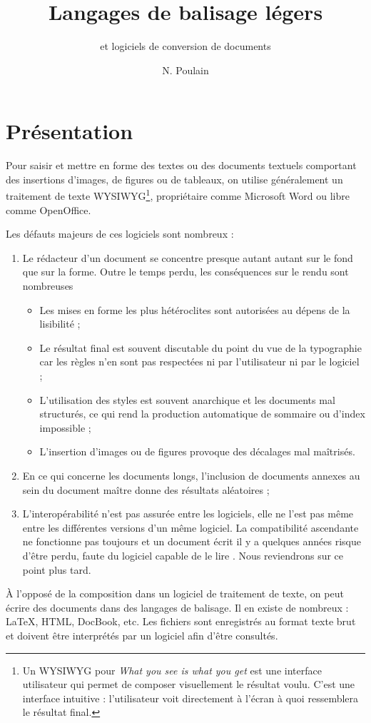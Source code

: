 \documentclass[12pt]{article}
\title{Langages de balisage légers}
\author{et logiciels de conversion de documents}
\date{N. Poulain}
\begin{document}
\maketitle

\tableofcontents
\newpage


\section{Présentation}

Pour saisir et mettre en forme des textes ou des documents textuels
comportant des insertions d'images, de figures ou de tableaux, on
utilise généralement un traitement de texte WYSIWYG\footnote{Un WYSIWYG
  pour \emph{What you see is what you get} est une interface utilisateur
  qui permet de composer visuellement le résultat voulu. C'est une
  interface intuitive : l'utilisateur voit directement à l'écran à quoi
  ressemblera le résultat final.}, propriétaire comme Microsoft Word ou
libre comme OpenOffice.

Les défauts majeurs de ces logiciels sont nombreux :

\begin{enumerate}[1.]
\item
  Le rédacteur d'un document se concentre presque autant autant sur le
  fond que sur la forme. Outre le temps perdu, les conséquences sur le
  rendu sont nombreuses
  \begin{itemize}
  \item
    Les mises en forme les plus hétéroclites sont autorisées au dépens
    de la lisibilité ;
  \item
    Le résultat final est souvent discutable du point du vue de la
    typographie car les règles n'en sont pas respectées ni par
    l'utilisateur ni par le logiciel ;
  \item
    L'utilisation des styles est souvent anarchique et les documents mal
    structurés, ce qui rend la production automatique de sommaire ou
    d'index impossible ;
  \item
    L'insertion d'images ou de figures provoque des décalages mal
    maîtrisés.
  \end{itemize}
\item
  En ce qui concerne les documents longs, l'inclusion de documents
  annexes au sein du document maître donne des résultats aléatoires ;
\item
  L'interopérabilité n'est pas assurée entre les logiciels, elle ne
  l'est pas même entre les différentes versions d'un même logiciel. La
  compatibilité ascendante ne fonctionne pas toujours et un document
  écrit il y a quelques années risque d'être perdu, faute du logiciel
  capable de le lire . Nous reviendrons sur ce point plus tard.
\end{enumerate}
À l'opposé de la composition dans un logiciel de traitement de texte, on
peut écrire des documents dans des langages de balisage. Il en existe de
nombreux : LaTeX, HTML, DocBook, etc. Les fichiers sont enregistrés au
format texte brut et doivent être interprétés par un logiciel afin
d'être consultés.
\end{document}
